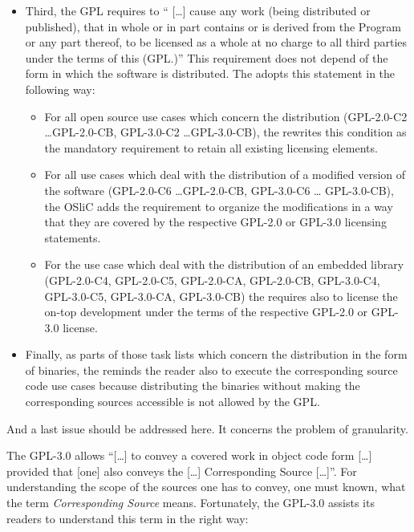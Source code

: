 \begin{itemize}
\item Third, the GPL requires to \enquote{ [\ldots] cause any work (being
  distributed or published), that in whole or in part contains or is derived
  from the Program or any part thereof, to be licensed as a whole at no charge
  to all third parties under the terms of this (GPL.)}
  This requirement does not depend of the form in which the software is
  distributed. The \oslic{} adopts this statement in the following way:
  \begin{itemize}
  \item For all open source use cases which concern the distribution (GPL-2.0-C2
    \ldots GPL-2.0-CB, GPL-3.0-C2 \ldots GPL-3.0-CB), the \oslic{} rewrites this
    condition as the mandatory requirement to retain all existing licensing
    elements.
      
  \item For all use cases which deal with the distribution of a modified version
    of the software (GPL-2.0-C6 \ldots GPL-2.0-CB, GPL-3.0-C6 \ldots
    GPL-3.0-CB), the OSliC adds the requirement to organize the modifications in
    a way that they are covered by the respective GPL-2.0 or GPL-3.0 licensing
    statements.
      
  \item For the use case which deal with the distribution of an embedded library
    (GPL-2.0-C4, GPL-2.0-C5, GPL-2.0-CA, GPL-2.0-CB, GPL-3.0-C4, GPL-3.0-C5,
    GPL-3.0-CA, GPL-3.0-CB) the \oslic{} requires also to license the on-top
    development under the terms of the respective GPL-2.0 or GPL-3.0 license.
    \end{itemize}
   
\item Finally, as parts of those task lists which concern the distribution in
  the form of binaries, the \oslic{} reminds the reader also to execute the
  corresponding source code use cases because distributing the binaries without
  making the corresponding sources accessible is not allowed by the GPL.
\end{itemize}

And a last issue should be addressed here. It concerns the problem of
granularity.

The GPL-3.0 allows \enquote{[\ldots] to convey a covered work in object code
form [\ldots] provided that [one] also conveys the [\ldots] Corresponding
Source [\ldots]}. For understanding the scope of the sources
one has to convey, one must known, what the term \emph{Corresponding Source}
means. Fortunately, the GPL-3.0 assists its readers to understand this term in
the right way:

